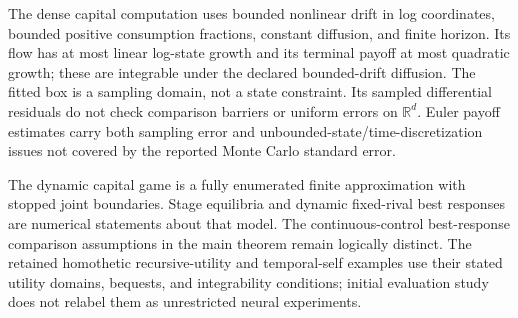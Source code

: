 The dense capital computation uses bounded nonlinear drift in log coordinates, bounded positive consumption fractions, constant diffusion, and finite horizon. Its flow has at most linear log-state growth and its terminal payoff at most quadratic growth; these are integrable under the declared bounded-drift diffusion. The fitted box is a sampling domain, not a state constraint. Its sampled differential residuals do not check comparison barriers or uniform errors on $\mathbb R^d$. Euler payoff estimates carry both sampling error and unbounded-state/time-discretization issues not covered by the reported Monte Carlo standard error.

The dynamic capital game is a fully enumerated finite approximation with stopped joint boundaries. Stage equilibria and dynamic fixed-rival best responses are numerical statements about that model. The continuous-control best-response comparison assumptions in the main theorem remain logically distinct. The retained homothetic recursive-utility and temporal-self examples use their stated utility domains, bequests, and integrability conditions; initial evaluation study does not relabel them as unrestricted neural experiments.
